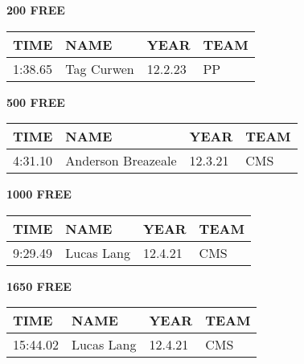 \begin{minipage}[t]{0.48\textwidth}
\centering
\textbf{200 FREE}\\[0.05cm]
\begin{tabular}{@{}p{1.8cm}p{2.8cm}p{1.2cm}p{1.4cm}@{}}
\hline
\textbf{TIME} & \textbf{NAME} & \textbf{YEAR} & \textbf{TEAM} \\
\hline
1:38.65 & Tag Curwen & 12.2.23 & PP \\
\hline
\end{tabular}
\end{minipage}\hfill
\begin{minipage}[t]{0.48\textwidth}
\centering
\textbf{500 FREE}\\[0.05cm]
\begin{tabular}{@{}p{1.8cm}p{2.8cm}p{1.2cm}p{1.4cm}@{}}
\hline
\textbf{TIME} & \textbf{NAME} & \textbf{YEAR} & \textbf{TEAM} \\
\hline
4:31.10 & Anderson Breazeale & 12.3.21 & CMS \\
\hline
\end{tabular}
\end{minipage}

\vspace{0.4cm}

\begin{minipage}[t]{0.48\textwidth}
\centering
\textbf{1000 FREE}\\[0.05cm]
\begin{tabular}{@{}p{1.8cm}p{2.8cm}p{1.2cm}p{1.4cm}@{}}
\hline
\textbf{TIME} & \textbf{NAME} & \textbf{YEAR} & \textbf{TEAM} \\
\hline
9:29.49 & Lucas Lang & 12.4.21 & CMS \\
\hline
\end{tabular}
\end{minipage}\hfill
\begin{minipage}[t]{0.48\textwidth}
\centering
\textbf{1650 FREE}\\[0.05cm]
\begin{tabular}{@{}p{1.8cm}p{2.8cm}p{1.2cm}p{1.4cm}@{}}
\hline
\textbf{TIME} & \textbf{NAME} & \textbf{YEAR} & \textbf{TEAM} \\
\hline
15:44.02 & Lucas Lang & 12.4.21 & CMS \\
\hline
\end{tabular}
\end{minipage}

\vspace{0.4cm}

